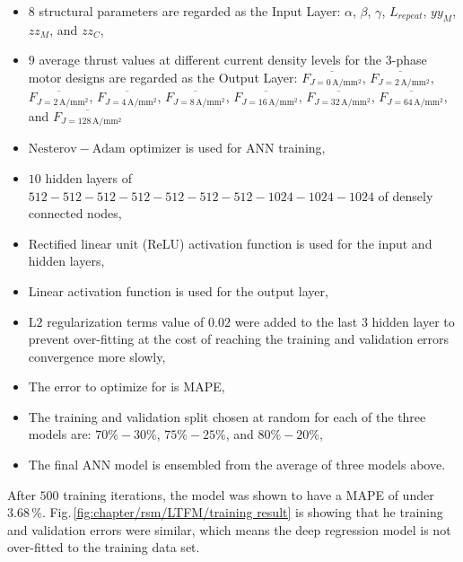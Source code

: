             
            \begin{itemize}
                \item $8$ structural parameters are regarded as the Input Layer: $\alpha$, $\beta$, $\gamma$, $L_{repeat}$, $yy_M$, $zz_M$, and $zz_C$, 
                \item $9$ average thrust values at different current density levels for the 3-phase motor designs are regarded as the Output Layer: $\overline{F_{J=0\,\mathrm{A/mm^2}}}$, $\overline{F_{J=2\,\mathrm{A/mm^2}}}$, $\overline{F_{J=2\,\mathrm{A/mm^2}}}$, $\overline{F_{J=4\,\mathrm{A/mm^2}}}$, $\overline{F_{J=8\,\mathrm{A/mm^2}}}$, $\overline{F_{J=16\,\mathrm{A/mm^2}}}$, $\overline{F_{J=32\,\mathrm{A/mm^2}}}$, $\overline{F_{J=64\,\mathrm{A/mm^2}}}$, and $\overline{F_{J=128\,\mathrm{A/mm^2}}}$
                \item $\mathrm{Nesterov-Adam}$ optimizer is used for \acs{ANN} training,
                \item $10$ hidden layers of $512-512-512-512-512-512-512-1024-1024-1024$ of densely connected nodes,
                \item Rectified linear unit (ReLU) activation function is used
for the input and hidden layers,
                \item Linear activation function is used for the output layer,
                \item $\mathrm{L2}$ regularization terms value of $0.02$ were added to the last $3$ hidden layer to prevent over-fitting at the cost of reaching the training and validation errors convergence more slowly,
                \item The error to optimize for is \acs{MAPE},
                \item The training and validation split chosen at random for each of the three models are: $70\%-30\%$, $75\%-25\%$, and $80\%-20\%$,
                \item The final \acs{ANN} model is ensembled from the average of three models above.
            \end{itemize}
            
            
            After $500$ training iterations, the model was shown to have a \acf{MAPE} of under $3.68\,\%$. Fig.\,\ref{fig:chapter/rsm/LTFM/training result} is showing that he training and validation errors were similar, which means the deep regression model is not over-fitted to the training data set.
            
